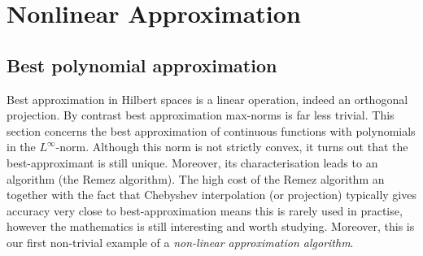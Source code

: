 
\section{Nonlinear Approximation}
%
\label{sec:nonlin}
%

\subsection{Best polynomial approximation}
%
\label{sec:poly:bestapprox}
%
Best approximation in Hilbert spaces is a linear operation, indeed an orthogonal
projection. By contrast best approximation max-norms is far less trivial. This
section concerns the best approximation of continuous functions with polynomials
in the $L^\infty$-norm. Although this norm is not strictly convex, it turns out
that the best-approximant is still unique. Moreover, its characterisation leads
to an algorithm (the Remez algorithm). The high cost of the Remez algorithm an
together with the fact that Chebyshev interpolation (or projection) typically
gives accuracy very close to best-approximation means this is rarely used in
practise, however the mathematics is still interesting and worth studying.
Moreover, this is our first non-trivial example of a {\em non-linear
approximation algorithm}.

